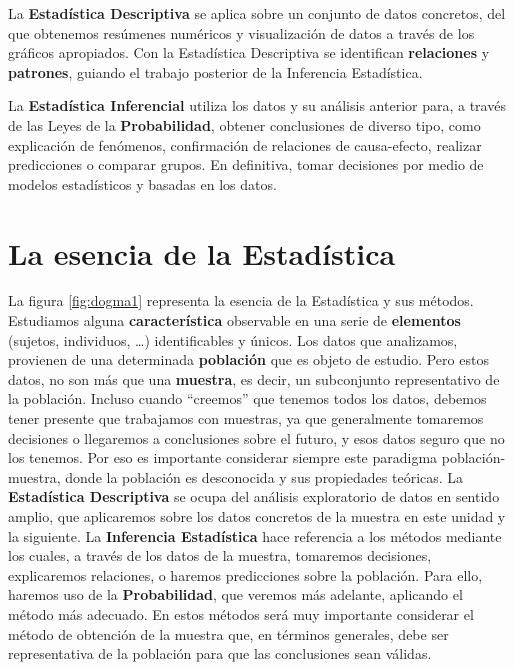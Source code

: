 \documentclass[
]{book}
\begin{document}
La \textbf{Estadística Descriptiva} se aplica sobre un conjunto de datos concretos,
del que obtenemos resúmenes numéricos y visualización de datos a través de
los gráficos apropiados. Con la Estadística Descriptiva se identifican \textbf{relaciones}
y \textbf{patrones}, guiando el trabajo posterior de la Inferencia Estadística.

La \textbf{Estadística Inferencial} utiliza los datos y su análisis anterior para, a través de las
Leyes de la \textbf{Probabilidad}, obtener conclusiones de diverso tipo, como explicación de fenómenos,
confirmación de relaciones de causa-efecto, realizar predicciones o comparar grupos.
En definitiva, tomar decisiones por medio de modelos estadísticos y basadas en
los datos.

\hypertarget{la-esencia-de-la-estaduxedstica}{%
\section{La esencia de la Estadística}\label{la-esencia-de-la-estaduxedstica}}

La figura \ref{fig:dogma1} representa
la esencia de la Estadística y sus métodos. Estudiamos alguna \textbf{característica}
observable en una serie de \textbf{elementos} (sujetos, individuos, \ldots)
identificables y únicos. Los datos que analizamos,
provienen de una determinada \textbf{población} que es objeto de estudio.
Pero estos datos, no son más que
una \textbf{muestra}, es decir, un subconjunto representativo de la población. Incluso
cuando ``creemos'' que tenemos todos los datos, debemos tener presente que trabajamos
con muestras, ya que generalmente tomaremos decisiones o llegaremos a conclusiones
sobre el futuro, y esos datos seguro que no los tenemos. Por eso es importante
considerar siempre este paradigma población-muestra, donde la
población es desconocida y sus propiedades teóricas. La \textbf{Estadística Descriptiva}
se ocupa del análisis exploratorio de datos en sentido amplio, que aplicaremos
sobre los datos concretos de la muestra en este unidad y la siguiente. La
\textbf{Inferencia Estadística} hace referencia a los métodos mediante los cuales,
a través de los datos de la muestra, tomaremos decisiones, explicaremos relaciones,
o haremos predicciones sobre la población. Para ello, haremos uso de la
\textbf{Probabilidad}, que veremos más adelante, aplicando
el método más adecuado.
En estos métodos será muy importante considerar el método de obtención de la muestra
que, en términos generales, debe ser representativa de la población para que las
conclusiones sean válidas.
\end{document}
